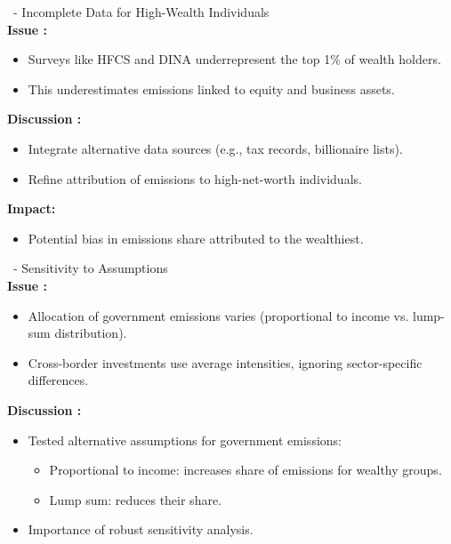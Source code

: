 \documentclass[10pt]{beamer}
\begin{document}
\begin{frame}{\subsecname \  - \subsubsecname}
    Incomplete Data for High-Wealth Individuals \\ 
    \textbf{Issue :}
    \begin{itemize}
        \item Surveys like HFCS and DINA underrepresent the top 1\% of wealth holders.
        \item This underestimates emissions linked to equity and business assets.
    \end{itemize}
    \vspace{0.3cm}
    \textbf{Discussion :}
    \begin{itemize}
        \item Integrate alternative data sources (e.g., tax records, billionaire lists).
        \item Refine attribution of emissions to high-net-worth individuals.
    \end{itemize}
    \vspace{0.3cm}
    \textbf{Impact:}
    \begin{itemize}
        \item Potential bias in emissions share attributed to the wealthiest.
    \end{itemize}
\end{frame}

\begin{frame}{\subsecname \  - \subsubsecname}
    Sensitivity to Assumptions \\ 
    \textbf{Issue :}
    \begin{itemize}
        \item Allocation of government emissions varies (proportional to income vs. lump-sum distribution).
        \item Cross-border investments use average intensities, ignoring sector-specific differences.
    \end{itemize}
    \vspace{0.3cm}
    \textbf{Discussion :}
    \begin{itemize}
        \item Tested alternative assumptions for government emissions:
        \begin{itemize}
            \item Proportional to income: increases share of emissions for wealthy groups.
            \item Lump sum: reduces their share.
        \end{itemize}
        \item Importance of robust sensitivity analysis.
    \end{itemize}
\end{frame}
\end{document}
